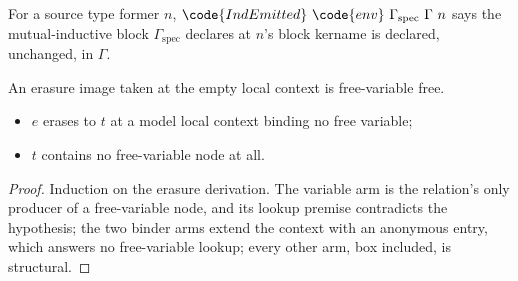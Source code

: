 \begin{definition}
\label{def:IndEmitted}
\leanok
{}
 For a source type former $n$,
$\code{IndEmitted}\ \code{env}\ \Gamma_{\mathrm{spec}}\ \Gamma\ n$ says the mutual-inductive block
$\Gamma_{\mathrm{spec}}$ declares at $n$'s block kername is declared, unchanged, in $\Gamma$.
\end{definition}
\begin{lemma}
\label{lem:Erases-noFVar}
\leanok
{}
 An erasure image taken at the empty local context is free-variable free.
\begin{itemize}
\item {} $e$ erases to $t$ at a model local context binding no free variable;
\item {} $t$ contains no free-variable node at all.
\end{itemize}
\end{lemma}
\begin{proof}
\leanok
{}
 Induction on the erasure derivation. The variable arm is the relation's only producer of a
free-variable node, and its lookup premise contradicts the hypothesis; the two binder arms extend the
context with an anonymous entry, which answers no free-variable lookup; every other arm, box included, is
structural.
\end{proof}
